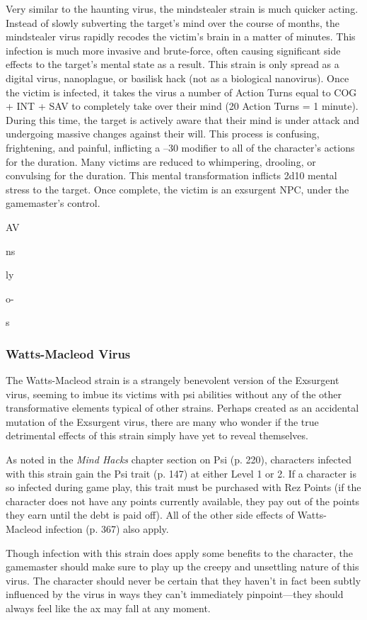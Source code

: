 Very similar to the haunting virus, the mindstealer 
strain is much quicker acting. Instead of slowly subverting
the target's mind over the course of months,
the mindstealer virus rapidly recodes the victim's brain 
in a matter of minutes. This infection is much more 
invasive and brute-force, often causing significant 
side effects to the target's mental state as a result. This 
strain is only spread as a digital virus, nanoplague, or 
basilisk hack (not as a biological nanovirus).
Once the victim is infected, it takes the virus a 
number of Action Turns equal to COG + INT + SAV 
to completely take over their mind (20 Action Turns 
= 1 minute). During this time, the target is actively 
aware that their mind is under attack and undergoing
massive changes against their will. This process
is confusing, frightening, and painful, inflicting  a 
–30 modifier to all of the character's actions for the 
duration. Many victims are reduced to whimpering, 
drooling, or convulsing for the duration.
This mental transformation inflicts 2d10 mental 
stress to the target. Once complete, the victim is an 
exsurgent NPC, under the gamemaster's control. 

AV

ns

ly 

o-

s

\subsubsection{Watts-Macleod Virus}

The Watts-Macleod strain is a strangely benevolent 
version of the Exsurgent virus, seeming to imbue its 
victims with psi abilities without any of the other 
transformative elements typical of other strains. 
Perhaps created as an accidental mutation of the Exsurgent
virus, there are many who wonder if the true
detrimental effects of this strain simply have yet to 
reveal themselves.

As noted in the \textit{Mind Hacks} chapter section on Psi 
(p. 220), characters infected with this strain gain the 
Psi trait (p. 147) at either Level 1 or 2. If a character 
is so infected during game play, this trait must be 
purchased with Rez Points (if the character does not 
have any points currently available, they pay out of 
the points they earn until the debt is paid off). All of 
the other side effects of Watts-Macleod infection (p. 
367) also apply.

Though infection with this strain does apply some 
benefits to the character, the gamemaster should make 
sure to play up the creepy and unsettling nature of 
this virus. The character should never be certain that 
they haven't in fact been subtly influenced by the virus 
in ways they can't immediately pinpoint—they should 
always feel like the ax may fall at any moment.

